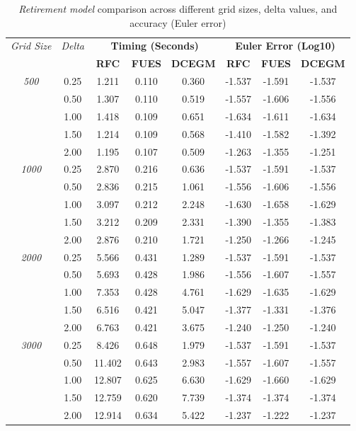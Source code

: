 
\begin{table}[htbp]
\centering
\small
\begin{tabular}{ccccc|ccc}
\toprule
\multirow{2}{*}{\textit{Grid Size}} & \multirow{2}{*}{\textit{Delta}} & \multicolumn{3}{c}{\textbf{Timing (Seconds)}} & \multicolumn{3}{c}{\textbf{Euler Error (Log10)}} \\
 & & \textbf{RFC} & \textbf{FUES} & \textbf{DCEGM} & \textbf{RFC} & \textbf{FUES} & \textbf{DCEGM} \\
\midrule
\multirow{5}{*}{\textit{500}} 
 & 0.25 & 1.211 & 0.110 & 0.360 & -1.537 & -1.591 & -1.537 \\
 & 0.50 & 1.307 & 0.110 & 0.519 & -1.557 & -1.606 & -1.556 \\
 & 1.00 & 1.418 & 0.109 & 0.651 & -1.634 & -1.611 & -1.634 \\
 & 1.50 & 1.214 & 0.109 & 0.568 & -1.410 & -1.582 & -1.392 \\
 & 2.00 & 1.195 & 0.107 & 0.509 & -1.263 & -1.355 & -1.251 \\
\midrule
\multirow{5}{*}{\textit{1000}} 
 & 0.25 & 2.870 & 0.216 & 0.636 & -1.537 & -1.591 & -1.537 \\
 & 0.50 & 2.836 & 0.215 & 1.061 & -1.556 & -1.606 & -1.556 \\
 & 1.00 & 3.097 & 0.212 & 2.248 & -1.630 & -1.658 & -1.629 \\
 & 1.50 & 3.212 & 0.209 & 2.331 & -1.390 & -1.355 & -1.383 \\
 & 2.00 & 2.876 & 0.210 & 1.721 & -1.250 & -1.266 & -1.245 \\
\midrule
\multirow{5}{*}{\textit{2000}} & 0.25 & 5.566 & 0.431 & 1.289 & -1.537 & -1.591 & -1.537 \\
 & 0.50 & 5.693 & 0.428 & 1.986 & -1.556 & -1.607 & -1.557 \\
 & 1.00 & 7.353 & 0.428 & 4.761 & -1.629 & -1.635 & -1.629 \\
 & 1.50 & 6.516 & 0.421 & 5.047 & -1.377 & -1.331 & -1.376 \\
 & 2.00 & 6.763 & 0.421 & 3.675 & -1.240 & -1.250 & -1.240 \\
\midrule
\multirow{5}{*}{\textit{3000}} & 0.25 & 8.426 & 0.648 & 1.979 & -1.537 & -1.591 & -1.537 \\
 & 0.50 & 11.402 & 0.643 & 2.983 & -1.557 & -1.607 & -1.557 \\
 & 1.00 & 12.807 & 0.625 & 6.630 & -1.629 & -1.660 & -1.629 \\
 & 1.50 & 12.759 & 0.620 & 7.739 & -1.374 & -1.374 & -1.374 \\
 & 2.00 & 12.914 & 0.634 & 5.422 & -1.237 & -1.222 & -1.237 \\
\midrule

\bottomrule
\end{tabular}
\caption{\textit{Retirement model} comparison across different grid sizes, delta values, and accuracy (Euler error)}
\label{tab:timing_comparison}
\end{table}
